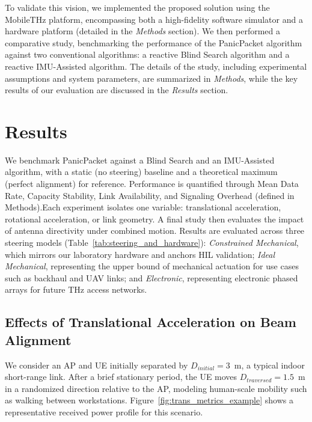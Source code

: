 \documentclass[fleqn,10pt]{wlscirep}
\begin{document}
To validate this vision, we implemented the proposed solution using the MobileTHz platform, encompassing both a high-fidelity software simulator and a hardware platform (detailed in the \textit{Methods} section). We then performed a comparative study, benchmarking the performance of the PanicPacket algorithm against two conventional algorithms: a reactive Blind Search algorithm and a reactive IMU-Assisted algorithm. The details of the study, including experimental assumptions and system parameters, are summarized in \textit{Methods}, while the key results of our evaluation are discussed in the \textit{Results} section.


\section*{Results}

We benchmark PanicPacket against a Blind Search and an IMU-Assisted algorithm, with a static (no steering) baseline and a theoretical maximum (perfect alignment) for reference. Performance is quantified through Mean Data Rate, Capacity Stability, Link Availability, and Signaling Overhead (defined in Methods).Each experiment isolates one variable: translational acceleration, rotational acceleration, or link geometry. A final study then evaluates the impact of antenna directivity under combined motion. Results are evaluated across three steering models (Table~\ref{tab:steering_and_hardware}): \textit{Constrained Mechanical}, which mirrors our laboratory hardware and anchors HIL validation; \textit{Ideal Mechanical}, representing the upper bound of mechanical actuation for use cases such as backhaul and UAV links; and \textit{Electronic}, representing electronic phased arrays for future THz access networks.

\subsection*{Effects of Translational Acceleration on Beam Alignment}

We consider an AP and UE initially separated by $D_{initial} = 3$~m, a typical indoor short-range link\cite{9013236}. After a brief stationary period, the UE moves $D_{traversed} = 1.5$~m in a randomized direction relative to the AP, modeling human-scale mobility such as walking between workstations. Figure~\ref{fig:trans_metrics_example} shows a representative received power profile for this scenario.
\end{document}
